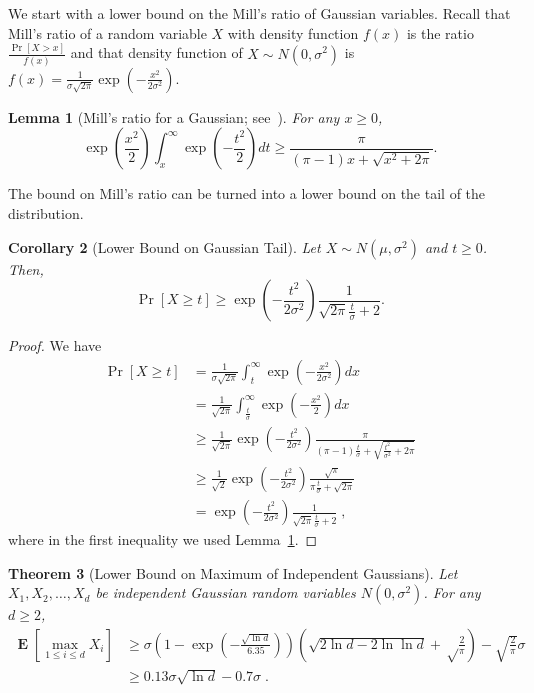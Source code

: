 \documentclass{article}
\DeclareMathOperator*{\Exp}{\mathbf{E}}
\newtheorem{theorem}{Theorem}
\newtheorem{lemma}[theorem]{Lemma}
\newtheorem{corrollary}[theorem]{Corollary}
\begin{document}
We start with a lower bound on the Mill's ratio of Gaussian variables. Recall that Mill's ratio of a random variable $X$
with density function $f(x)$ is the ratio $\frac{\Pr[X > x]}{f(x)}$ and that density function of $X \sim N(0,\sigma^2)$
is $f(x) = \frac{1}{\sigma \sqrt{2 \pi}} \exp\left( - \frac{x^2}{2 \sigma^2} \right)$.

\begin{lemma}[Mill's ratio for a Gaussian; see~\cite{Boyd-1959}]
\label{lemma:boyd}
For any $x \ge 0$,
\[
\exp\left(\frac{x^2}{2}\right) \int_x^{\infty} \exp\left(-\frac{t^2}{2}\right) dt
\ge \frac{\pi}{(\pi-1)x+\sqrt{x^2+2 \pi}}.
\]
\end{lemma}

The bound on Mill's ratio can be turned into a lower bound on the tail of the distribution.

\begin{corrollary}[Lower Bound on Gaussian Tail]
Let $X \sim N(\mu, \sigma^2)$ and $t \ge 0$. Then,
$$
\Pr[X \ge t] \ge \exp\left(-\frac{t^2}{2 \sigma^2}\right) \frac{1}{\sqrt{2\pi}\frac{t}{\sigma}+2}.
$$
\end{corrollary}

\begin{proof}
We have
\begin{align*}
\Pr[X \ge t]
& = \frac{1}{\sigma \sqrt{2 \pi}} \int_t^{\infty} \exp \left( -\frac{x^2}{2 \sigma^2} \right) d x \\
& = \frac{1}{\sqrt{2 \pi}} \int_\frac{t}{\sigma}^{\infty} \exp \left( -\frac{x^2}{2} \right) d x \\
& \ge \frac{1}{\sqrt{2 \pi}} \exp\left(-\frac{t^2}{2 \sigma^2}\right) \frac{\pi}{(\pi-1)\frac{t}{\sigma}+\sqrt{\frac{t^2}{\sigma^2}+2 \pi}} \\
& \ge \frac{1}{\sqrt{2}} \exp\left(-\frac{t^2}{2 \sigma^2}\right) \frac{\sqrt{\pi}}{\pi\frac{t}{\sigma}+\sqrt{2 \pi}} \\
& = \exp\left(-\frac{t^2}{2 \sigma^2}\right) \frac{1}{\sqrt{2\pi}\frac{t}{\sigma}+2} \; ,
\end{align*}
where in the first inequality we used Lemma~\ref{lemma:boyd}.
\end{proof}

\begin{theorem}[Lower Bound on Maximum of Independent Gaussians]
Let $X_1, X_2, \dots, X_d$ be independent Gaussian random variables $N(0,\sigma^2)$. For any $d \ge 2$,
\begin{align}
\Exp \left[\max_{1 \le i \le d} X_i\right]
& \ge \sigma \left(1 - \exp\left(-\frac{\sqrt{\ln d}}{6.35}\right)\right) \left(\sqrt{2 \ln d - 2 \ln \ln d} +\sqrt\frac{2}{\pi}\right) -\sqrt{\frac{2}{\pi}} \sigma \label{equation:maximum-of-gaussians-lower-bound-1} \\
& \ge 0.13 \sigma \sqrt{\ln d} - 0.7 \sigma \label{equation:maximum-of-gaussians-lower-bound-2} \; .
\end{align}
\end{theorem}
\end{document}
